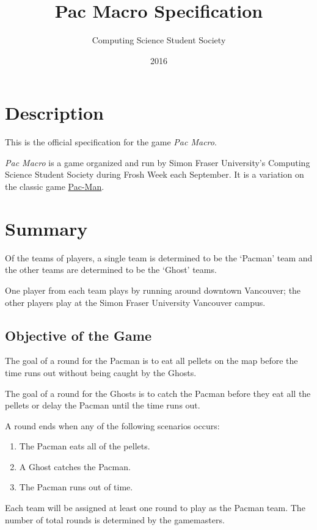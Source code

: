 \documentclass[10pt, oneside, letterpaper, titlepage]{article}
\title{Pac Macro Specification}
\author{Computing Science Student Society}
\date{2016}
\begin{document}
	\maketitle
	\clearpage
	\tableofcontents
	\clearpage

	\section{Description}
	\label{sec:description}

	This is the official specification for the game \emph{Pac Macro}.

	\emph{Pac Macro} is a game organized and run by Simon Fraser University's Computing Science Student Society during Frosh Week each September. It is a variation on the classic game \href{https://en.wikipedia.org/wiki/Pac-Man}{Pac-Man}.

	\section{Summary}
	\label{sec:summary}

	Of the teams of players, a single team is determined to be the `Pacman' team and the other teams are determined to be the `Ghost' teams.

	One player from each team plays by running around downtown Vancouver; the other players play at the Simon Fraser University Vancouver campus.

	\subsection{Objective of the Game}
	\label{subsec:summary:objective-of-the-game}

	The goal of a round for the Pacman is to eat all pellets on the map before the time runs out without being caught by the Ghosts.

	The goal of a round for the Ghosts is to catch the Pacman before they eat all the pellets or delay the Pacman until the time runs out.

	A round ends when any of the following scenarios occurs:
	\begin{enumerate}
		\item The Pacman eats all of the pellets.
		\item A Ghost catches the Pacman.
		\item The Pacman runs out of time.
	\end{enumerate}

	Each team will be assigned at least one round to play as the Pacman team. The number of total rounds is determined by the gamemasters.
\end{document}
